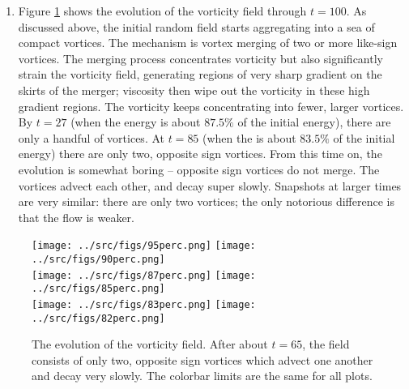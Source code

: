 \documentclass[11pt]{article}
\begin{document}
\begin{enumerate}
    \item Figure \ref{fig:vort} shows the evolution of the vorticity field through $t=100$. As discussed above,
        the initial random field starts aggregating into a sea of compact vortices. The mechanism is vortex
        merging of two or more like-sign vortices. The merging process concentrates vorticity but also significantly
        strain the vorticity field, generating regions of very sharp gradient on the skirts of the merger;
        viscosity then wipe out the vorticity in these high gradient regions. The vorticity keeps concentrating into fewer, larger vortices. By $t=27$ (when the energy is about $87.5 \%$ of the initial energy), there are only a handful of vortices.
        At $t=85$ (when the is about $83.5 \%$ of the initial energy) there are only two, opposite sign vortices. From
        this time on, the evolution is somewhat boring – opposite sign vortices do not merge. The vortices advect
        each other, and decay super slowly. Snapshots at larger times are very similar: there are only two vortices; 
        the only notorious difference is that the flow is weaker.

\end{enumerate}


\begin{figure}[ht]
\begin{center}
\texttt{[image: ../src/figs/95perc.png]} 
    \texttt{[image: ../src/figs/90perc.png]} \\
    \texttt{[image: ../src/figs/87perc.png]}     
    \texttt{[image: ../src/figs/85perc.png]} \\
    \texttt{[image: ../src/figs/83perc.png]}     
    \texttt{[image: ../src/figs/82perc.png]} 
\end{center}
\caption{The evolution of the vorticity field. After about $t=65$, the field consists of only two, opposite sign vortices which advect one another and decay very slowly. The colorbar limits are the same for all plots.}
\label{fig:vort}
\end{figure}

\newpage


\end{document}
